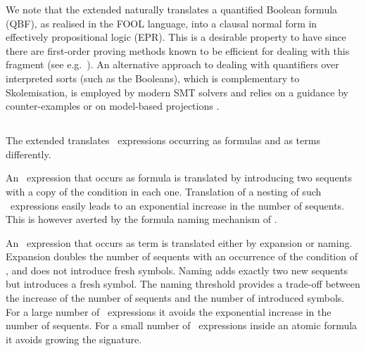 We note that the extended \newcnf{} naturally translates a quantified Boolean formula (QBF),
as realised in the FOOL language, into a clausal normal form in effectively propositional logic (EPR). 
This is a desirable property to have since there are first-order proving methods 
known to be efficient for dealing with this fragment (see e.g.~\cite{DBLP:conf/birthday/Korovin13}).
An alternative approach to dealing with quantifiers over interpreted sorts (such as the Booleans), 
which is complementary to Skolemisation,
is employed by modern SMT solvers and relies on a guidance by counter-examples 
\cite{DBLP:journals/corr/Reynolds0K15} or on model-based projections \cite{LPAR-20:Playing_with_Quantified_Satisfaction}.


\subsection{\ITE}
The extended \newcnf{} translates \ITE\ expressions occurring as formulas and as terms differently.

An \ITE\ expression that occurs as formula is translated by introducing two sequents with a copy of the condition in each one. Translation of a nesting of such \ITE\ expressions easily leads to an exponential increase in the number of sequents. This is however averted by the formula naming mechanism of \newcnf{}.

An \ITE\ expression that occurs as term is translated either by expansion or naming. Expansion doubles the number of sequents with an occurrence of the condition of \ITE, and does not introduce fresh symbols. Naming adds exactly two new sequents but introduces a fresh symbol. The naming threshold provides a trade-off between the increase of the number of sequents and the number of introduced symbols. For a large number of \ITE\ expressions it avoids the exponential increase in the number of sequents. For a small number of \ITE\ expressions inside an atomic formula it avoids growing the signature.

